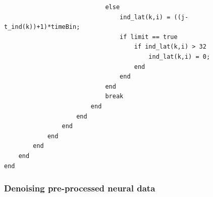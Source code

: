 \begin{lstlisting}
                            else
                                ind_lat(k,i) = ((j-t_ind(k))+1)*timeBin;
                                if limit == true
                                    if ind_lat(k,i) > 32 
                                        ind_lat(k,i) = 0; 
                                    end
                                end
                            end
                            break
                        end
                    end
                end
            end
        end
    end
end

\end{lstlisting}


%

\subsubsection{Denoising pre-processed neural data}

